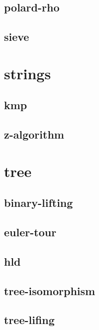 \documentclass[a4paper, twocolumn]{article}
\begin{document}
\subsection{polard-rho}

\subsection{sieve}

\section{strings}
\subsection{kmp}

\subsection{z-algorithm}

\section{tree}
\subsection{binary-lifting}

\subsection{euler-tour}

\subsection{hld}

\subsection{tree-isomorphism}

\subsection{tree-lifing}

\end{document}
